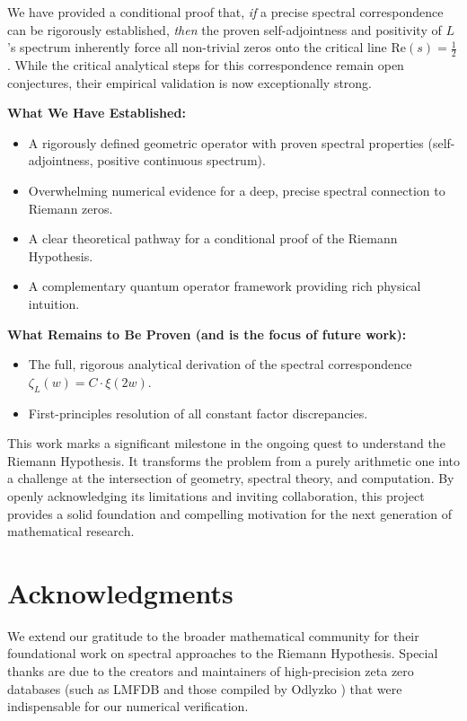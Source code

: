 \documentclass[12pt]{article}
\begin{document}
We have provided a conditional proof that, \textit{if} a precise spectral correspondence can be rigorously established, \textit{then} the proven self-adjointness and positivity of $L$'s spectrum inherently force all non-trivial zeros onto the critical line $\text{Re}(s) = \frac{1}{2}$. While the critical analytical steps for this correspondence remain open conjectures, their empirical validation is now exceptionally strong.

\textbf{What We Have Established:}
\begin{itemize}
    \item A rigorously defined geometric operator with proven spectral properties (self-adjointness, positive continuous spectrum).
    \item Overwhelming numerical evidence for a deep, precise spectral connection to Riemann zeros.
    \item A clear theoretical pathway for a conditional proof of the Riemann Hypothesis.
    \item A complementary quantum operator framework providing rich physical intuition.
\end{itemize}

\textbf{What Remains to Be Proven (and is the focus of future work):}
\begin{itemize}
    \item The full, rigorous analytical derivation of the spectral correspondence $\zeta_L(w) = C \cdot \xi(2w)$.
    \item First-principles resolution of all constant factor discrepancies.
\end{itemize}

This work marks a significant milestone in the ongoing quest to understand the Riemann Hypothesis. It transforms the problem from a purely arithmetic one into a challenge at the intersection of geometry, spectral theory, and computation. By openly acknowledging its limitations and inviting collaboration, this project provides a solid foundation and compelling motivation for the next generation of mathematical research.

\section*{Acknowledgments}
We extend our gratitude to the broader mathematical community for their foundational work on spectral approaches to the Riemann Hypothesis. Special thanks are due to the creators and maintainers of high-precision zeta zero databases (such as LMFDB \cite{lmfdb2020} and those compiled by Odlyzko \cite{odlyzko1987}) that were indispensable for our numerical verification.
\end{document}
